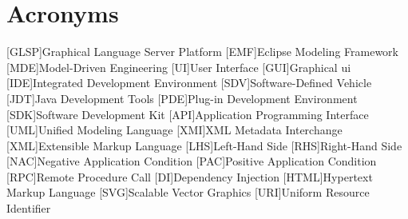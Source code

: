 \newpage
\section{Acronyms}
\label{sec:acronyms}
\begin{acronym}
    [GLSP]{Graphical Language Server Platform}
    [EMF]{Eclipse Modeling Framework}
    [MDE]{Model-Driven Engineering}
    [UI]{User Interface}
    [GUI]{Graphical \acf{ui}}
    [IDE]{Integrated Development Environment}
    [SDV]{Software-Defined Vehicle}
    [JDT]{Java Development Tools}
    [PDE]{Plug-in Development Environment}
    [SDK]{Software Development Kit}
    [API]{Application Programming Interface}
    [UML]{Unified Modeling Language}
    [XMI]{XML Metadata Interchange}
    [XML]{Extensible Markup Language}
    [LHS]{Left-Hand Side}
    [RHS]{Right-Hand Side}
    [NAC]{Negative Application Condition}
    [PAC]{Positive Application Condition}
    [RPC]{Remote Procedure Call}
    [DI]{Dependency Injection}
    [HTML]{Hypertext Markup Language}
    [SVG]{Scalable Vector Graphics}
    [URI]{Uniform Resource Identifier}
  \end{acronym}